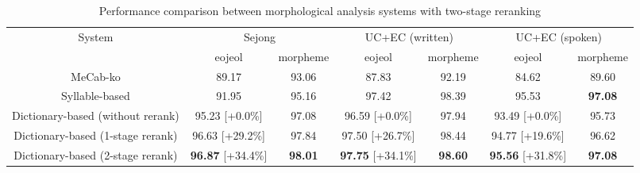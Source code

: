 \documentclass[AMS,STIX2COL]{WileyNJD-v2}
\begin{document}
    \begin{table}[ht]
        \caption{Performance comparison between morphological analysis systems with two-stage reranking}
        \label{tab:performance-with-reranking}
        \begin{tabular*}{500pt}{@{\extracolsep\fill}c|cccccc@{\extracolsep\fill}}
            \toprule
            \multirow{2}{*}{System}                       & \multicolumn{2}{c}{Sejong}                                             & \multicolumn{2}{c}{UC+EC (written)}                                    & \multicolumn{2}{c}{UC+EC (spoken)}                                     \\
            \cmidrule{2-3} \cmidrule{4-5} \cmidrule{6-7}
            ~                                             & \multicolumn{1}{c}{eojeol}              & \multicolumn{1}{c}{morpheme} & \multicolumn{1}{c}{eojeol}              & \multicolumn{1}{c}{morpheme} & \multicolumn{1}{c}{eojeol}              & \multicolumn{1}{c}{morpheme} \\
            \midrule
            \hspace{2mm}MeCab-ko                          & 89.17                                   & 93.06                        & 87.83                                   & 92.19                        & 84.62                                   & 89.60                        \\
            \hspace{2mm}Syllable-based                    & 91.95                                   & 95.16                        & 97.42                                   & 98.39                        & 95.53                                   & \textbf{97.08}               \\
            \hspace{2mm}Dictionary-based (without rerank) & 95.23\footnotesize{ [+0.0\%]}           & 97.08                        & 96.59\footnotesize{ [+0.0\%]}           & 97.94                        & 93.49\footnotesize{ [+0.0\%]}           & 95.73                        \\
            \hspace{2mm}Dictionary-based (1-stage rerank) & 96.63\footnotesize{ [+29.2\%]}          & 97.84                        & 97.50\footnotesize{ [+26.7\%]}          & 98.44                        & 94.77\footnotesize{ [+19.6\%]}          & 96.62                        \\
            \hspace{2mm}Dictionary-based (2-stage rerank) & \textbf{96.87}\footnotesize{ [+34.4\%]} & \textbf{98.01}               & \textbf{97.75}\footnotesize{ [+34.1\%]} & \textbf{98.60}               & \textbf{95.56}\footnotesize{ [+31.8\%]} & \textbf{97.08}               \\

\end{tabular*}
\end{table}
\end{document}
